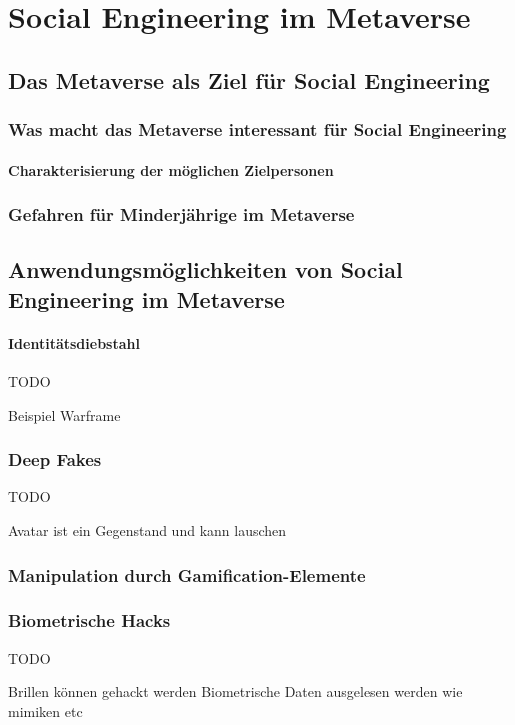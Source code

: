 \chapter{Social Engineering im Metaverse}\label{ch:SocialEngineeringimMV}

\section{Das Metaverse als Ziel für Social Engineering}

\subsection{Was macht das Metaverse interessant für Social Engineering}

\subsubsection{Charakterisierung der möglichen Zielpersonen}

\subsection{Gefahren für Minderjährige im Metaverse}

\section{Anwendungsmöglichkeiten von Social Engineering im Metaverse}

\subsubsection{Identitätsdiebstahl}
TODO

Beispiel Warframe
\subsection{Deep Fakes}
TODO

Avatar ist ein Gegenstand und kann lauschen
\subsection{Manipulation durch Gamification-Elemente}
\subsection{Biometrische Hacks}
TODO

Brillen können gehackt werden Biometrische Daten ausgelesen werden wie mimiken etc 

